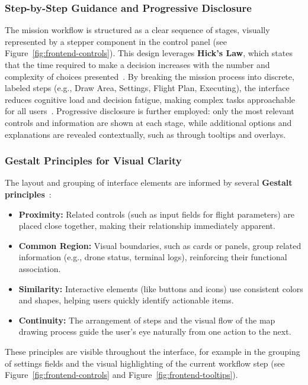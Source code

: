 \subsubsection{Step-by-Step Guidance and Progressive Disclosure}

The mission workflow is structured as a clear sequence of stages, visually represented by a stepper component in the control panel (see Figure~\ref{fig:frontend-controls}). 
This design leverages \textbf{Hick’s Law}, which states that the time required to make a decision increases with the number and complexity of choices presented~\cite{hickslaw}. 
By breaking the mission process into discrete, labeled steps (e.g., Draw Area, Settings, Flight Plan, Executing), the interface reduces cognitive load and decision fatigue, making complex tasks approachable for all users~\cite{hickslaw}. 
Progressive disclosure is further employed: only the most relevant controls and information are shown at each stage, while additional options and explanations are revealed contextually, such as through tooltips and overlays.

\subsubsection{Gestalt Principles for Visual Clarity}

The layout and grouping of interface elements are informed by several \textbf{Gestalt principles}~\cite{gestalt_ui}:
\begin{itemize}
    \item \textbf{Proximity:} Related controls (such as input fields for flight parameters) are placed close together, making their relationship immediately apparent.
    \item \textbf{Common Region:} Visual boundaries, such as cards or panels, group related information (e.g., drone status, terminal logs), reinforcing their functional association.
    \item \textbf{Similarity:} Interactive elements (like buttons and icons) use consistent colors and shapes, helping users quickly identify actionable items.
    \item \textbf{Continuity:} The arrangement of steps and the visual flow of the map drawing process guide the user's eye naturally from one action to the next.
\end{itemize}
These principles are visible throughout the interface, for example in the grouping of settings fields and the visual highlighting of the current workflow step (see Figure~\ref{fig:frontend-controls} and Figure~\ref{fig:frontend-tooltips}).

